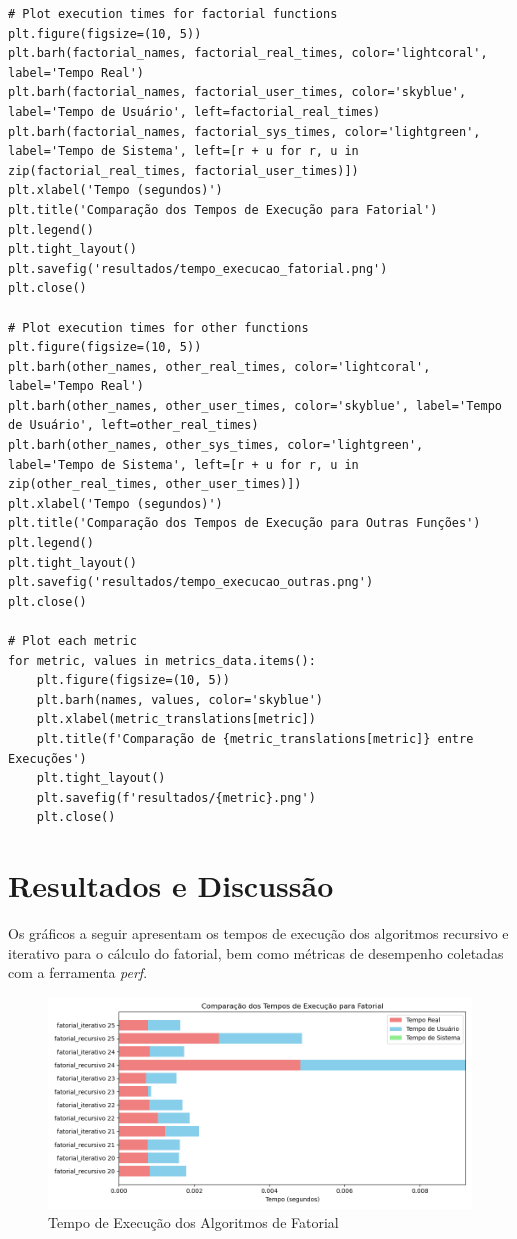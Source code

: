 \documentclass[12pt]{article}
\begin{document}
\begin{verbatim}
# Plot execution times for factorial functions
plt.figure(figsize=(10, 5))
plt.barh(factorial_names, factorial_real_times, color='lightcoral', label='Tempo Real')
plt.barh(factorial_names, factorial_user_times, color='skyblue', label='Tempo de Usuário', left=factorial_real_times)
plt.barh(factorial_names, factorial_sys_times, color='lightgreen', label='Tempo de Sistema', left=[r + u for r, u in zip(factorial_real_times, factorial_user_times)])
plt.xlabel('Tempo (segundos)')
plt.title('Comparação dos Tempos de Execução para Fatorial')
plt.legend()
plt.tight_layout()
plt.savefig('resultados/tempo_execucao_fatorial.png')
plt.close()

# Plot execution times for other functions
plt.figure(figsize=(10, 5))
plt.barh(other_names, other_real_times, color='lightcoral', label='Tempo Real')
plt.barh(other_names, other_user_times, color='skyblue', label='Tempo de Usuário', left=other_real_times)
plt.barh(other_names, other_sys_times, color='lightgreen', label='Tempo de Sistema', left=[r + u for r, u in zip(other_real_times, other_user_times)])
plt.xlabel('Tempo (segundos)')
plt.title('Comparação dos Tempos de Execução para Outras Funções')
plt.legend()
plt.tight_layout()
plt.savefig('resultados/tempo_execucao_outras.png')
plt.close()

# Plot each metric
for metric, values in metrics_data.items():
    plt.figure(figsize=(10, 5))
    plt.barh(names, values, color='skyblue')
    plt.xlabel(metric_translations[metric])
    plt.title(f'Comparação de {metric_translations[metric]} entre Execuções')
    plt.tight_layout()
    plt.savefig(f'resultados/{metric}.png')
    plt.close()
\end{verbatim}

\newpage

\section{Resultados e Discussão}
Os gráficos a seguir apresentam os tempos de execução dos algoritmos recursivo e iterativo para o cálculo do fatorial, bem como métricas de desempenho coletadas com a ferramenta \textit{perf}.

\begin{figure}[H]
    \centering
    \includegraphics[width=\linewidth]{resultados/tempo_execucao_fatorial.png}
    \caption{Tempo de Execução dos Algoritmos de Fatorial}
    \label{fig:tempo_execucao}
\end{figure}
\end{document}
